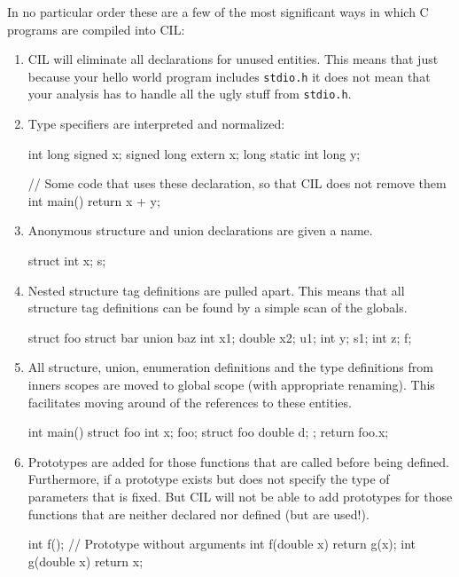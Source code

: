 \documentclass{article}
\def\t#1{{\tt #1}}
\begin{document}
 In no particular order these are a few of the most significant ways in which
C programs are compiled into CIL:
\begin{enumerate}
\item CIL will eliminate all declarations for unused entities. This means that
just because your hello world program includes \t{stdio.h} it does not mean
that your analysis has to handle all the ugly stuff from \t{stdio.h}.

\item Type specifiers are interpreted and normalized:
\begin{cilcode}[global]
int long signed x;
signed long extern x;
long static int long y;

// Some code that uses these declaration, so that CIL does not remove them
int main() { return x + y; }
\end{cilcode}

\item Anonymous structure and union declarations are given a name. 
\begin{cilcode}[global]
 struct { int x; } s;
\end{cilcode}

\item Nested structure tag definitions are pulled apart. This means that all
structure tag definitions can be found by a simple scan of the globals.

\begin{cilcode}[global]
struct foo {
   struct bar {
      union baz { 
          int x1; 
          double x2;
      } u1;
      int y;
   } s1;
   int z;
} f;
\end{cilcode}

\item All structure, union, enumeration definitions and the type definitions
from inners scopes are moved to global scope (with appropriate renaming). This
facilitates moving around of the references to these entities.

\begin{cilcode}[global]
int main() {
  struct foo { 
        int x; } foo; 
  {
     struct foo { 
        double d;
     };
     return foo.x;
  }      
}
\end{cilcode}

\item Prototypes are added for those functions that are called before being
defined. Furthermore, if a prototype exists but does not specify the type of
parameters that is fixed. But CIL will not be able to add prototypes for those
functions that are neither declared nor defined (but are used!).
\begin{cilcode}[global]
  int f();  // Prototype without arguments
  int f(double x) {
      return g(x);
  }
  int g(double x) {
     return x;
  } 
\end{cilcode}


\end{enumerate}
\end{document}
